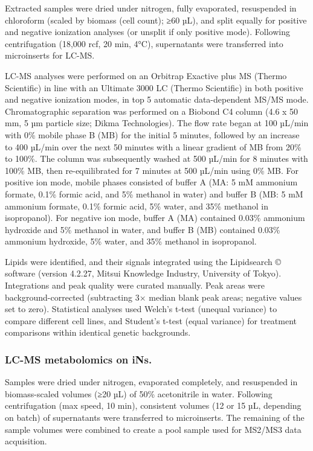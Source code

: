 Extracted samples were dried under nitrogen, fully evaporated, resuspended in chloroform (scaled by biomass (cell count); ≥60 µL), and split equally for positive and negative ionization analyses (or unsplit if only positive mode). Following centrifugation (18,000 rcf, 20 min, 4°C), supernatants were transferred into microinserts for LC-MS.

LC-MS analyses were performed on an Orbitrap Exactive plus MS (Thermo Scientific) in line with an Ultimate 3000 LC (Thermo Scientific) in both positive and negative ionization modes, in top 5 automatic data-dependent MS/MS mode. Chromatographic separation was performed on a Biobond C4 column (4.6 x 50 mm, 5 µm particle size; Dikma Technologies). The flow rate began at 100 µL/min with 0\% mobile phase B (MB) for the initial 5 minutes, followed by an increase to 400 µL/min over the next 50 minutes with a linear gradient of MB from 20\% to 100\%. The column was subsequently washed at 500 µL/min for 8 minutes with 100\% MB, then re-equilibrated for 7 minutes at 500 µL/min using 0\% MB. For positive ion mode, mobile phases consisted of buffer A (MA: 5 mM ammonium formate, 0.1\% formic acid, and 5\% methanol in water) and buffer B (MB: 5 mM ammonium formate, 0.1\% formic acid, 5\% water, and 35\% methanol in isopropanol). For negative ion mode, buffer A (MA) contained 0.03\% ammonium hydroxide and 5\% methanol in water, and buffer B (MB) contained 0.03\% ammonium hydroxide, 5\% water, and 35\% methanol in isopropanol.

Lipids were identified, and their signals integrated using the Lipidsearch © software (version 4.2.27, Mitsui Knowledge Industry, University of Tokyo). Integrations and peak quality were curated manually. Peak areas were background-corrected (subtracting 3× median blank peak areas; negative values set to zero). Statistical analyses used Welch's t-test (unequal variance) to compare different cell lines, and Student's t-test (equal variance) for treatment comparisons within identical genetic backgrounds.

\subsubsection{LC-MS metabolomics on iNs.}
Samples were dried under nitrogen, evaporated completely, and resuspended in biomass-scaled volumes (≥20 µL) of 50\% acetonitrile in water. Following centrifugation (max speed, 10 min), consistent volumes (12 or 15 µL, depending on batch) of supernatants were transferred to microinserts. The remaining of the sample volumes were combined to create a pool sample used for MS2/MS3 data acquisition.

